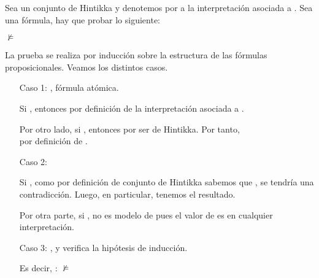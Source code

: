 \begin{isabellebody}
\begin{isamarkuptext}
\begin{demostracion}
  Sea  un conjunto de Hintikka y denotemos por  a la 
  interpretación asociada a . Sea  una fórmula, hay que probar lo 
  siguiente:

    $\not\models$ 

  La prueba se realiza por inducción sobre la estructura de las 
  fórmulas proposicionales. Veamos los distintos casos.

\begin{enumerate}
   \item[Caso 1:] , fórmula atómica.

    Si , entonces  por definición de la 
    interpretación asociada a . 

    Por otro lado, si , entonces
     por ser  de Hintikka. Por tanto,\\  
    por definición de . 

   \item[Caso 2:]    

    Si , como por definición de conjunto de Hintikka sabemos que 
    , se tendría una contradicción. Luego, en particular, 
    tenemos el resultado.

    Por otra parte, si ,  no es modelo de \isa{{\isasymbottom}} pues el 
    valor de \isa{{\isasymbottom}} es  en cualquier interpretación.

   \item[Caso 3:] , y  verifica la hipótesis de inducción. 

    Es decir, :   
        $\not\models$ 


\end{enumerate}
\end{demostracion}
\end{isamarkuptext}
\end{isabellebody}
